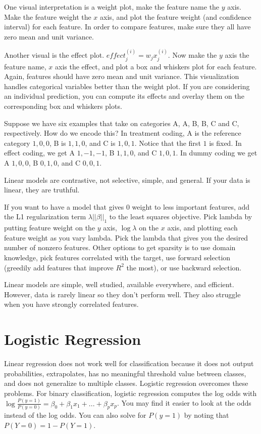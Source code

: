 \documentclass[a4paper]{article}
\begin{document}
One visual interpretation is a weight plot, make the feature name the $y$ axis.
Make the feature weight the $x$ axis, and plot the feature weight (and
confidence interval) for each feature. In order to compare features, make sure
they all have zero mean and unit variance.

Another visual is the effect plot. $effect_j^{(i)} = w_j x^{(i)}_j$. Now
make the $y$ axis the feature name, $x$ axis the effect, and plot a box and
whiskers plot for each feature. Again, features should have
zero mean and unit variance. This visualization handles categorical variables
better than the weight plot. If you are considering an individual prediction,
you can compute its effects and overlay them on the corresponding box and
whiskers plots.

Suppose we have six examples that take on categories A, A, B, B, C and C,
respectively. How do we encode this? In treatment coding, A is the reference
category $1, 0, 0$, B is $1, 1, 0$, and C is $1, 0,1$. Notice that the first $1$
is fixed. In effect coding, we get A $1, -1, -1$, B $1, 1, 0$, and C $1, 0, 1$.
In dummy coding we get A $1, 0, 0$, B $0, 1, 0$, and C $0, 0, 1$.

Linear models are contrastive, not selective, simple, and general. If your data
is linear, they are truthful.

If you want to have a model that gives 0 weight to less important features, add
the L1 regularization term $\lambda ||\beta||_1$ to the least squares objective.
Pick lambda by putting feature weight on the $y$ axis, $\log{\lambda}$ on the
$x$ axis, and plotting each feature weight as you vary lambda. Pick the lambda
that gives you the desired number of nonzero features. Other options to get
sparsity is to use domain knowledge, pick features correlated with the target,
use forward selection (greedily add features that improve $R^2$ the most),
or use backward selection.

Linear models are simple, well studied, available everywhere, and efficient.
However, data is rarely linear so they don't perform well. They also struggle
when you have strongly correlated features.

\section{Logistic Regression}
Linear regression does not work well for classification because it does not
output probabilities, extrapolates, has no meaningful threshold value
between classes, and does not generalize to multiple classes. Logistic
regression overcomes these problems. For binary classification, logistic
regression computes the log odds with $\log{\frac{P(y = 1)}{P(y = 0)}} = \beta_0 +
\beta_1 x_1 + ... + \beta_p x_p$. You may find it easier to look at the odds
instead of the log odds. You can also solve for $P(y = 1)$ by noting that
$P(Y = 0) = 1 - P(Y = 1)$.
\end{document}
